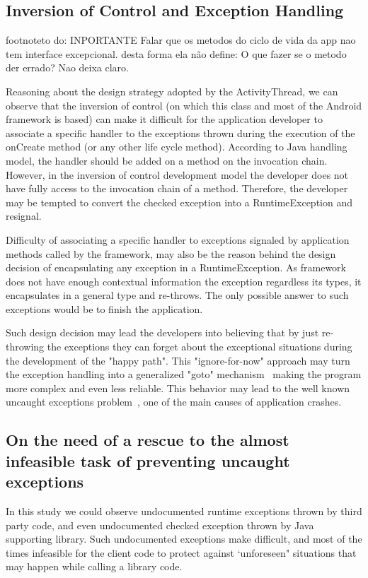 \documentclass[conference]{IEEEtran}
\begin{document}
\subsection{Inversion of Control and Exception Handling}

footnote{to do: INPORTANTE Falar que os metodos do ciclo de vida da app nao tem interface excepcional.
desta forma ela não define: O que fazer se o metodo der errado? Nao deixa claro.}

Reasoning about the design strategy adopted by the ActivityThread,
we can observe that the inversion of control (on which this class and 
most of the Android framework is based) can make it difficult for the application developer to 
associate a specific handler to the exceptions thrown during the execution of the onCreate method (or any other life cycle method).
According to Java handling model, the handler should be added on a method on the invocation chain. 
However,  in the inversion of control development model the developer does not have fully access to 
the invocation chain of a method. Therefore, the developer may be tempted to convert the checked
 exception into a RuntimeException and resignal.

Difficulty of associating a specific handler to exceptions signaled by application methods called by the framework,
may also be the reason behind the design decision of encapsulating any exception in a RuntimeException.
As framework does not have enough contextual information the exception regardless its types,
it encapsulates in a general type and re-throws. The only possible answer to such exceptions would be 
to finish the application.

Such design decision may lead the developers into believing that by just re-throwing 
the exceptions they can forget about the exceptional situations during the development of the "happy path". 
This "ignore-for-now" approach may turn the exception handling into a generalized "goto" mechanism~\cite{mandrioli1992advances}
 making the program more complex and even less reliable. This behavior may lead to the well known uncaught exceptions 
problem~\cite{jo2004uncaught}, one of the main causes of application crashes.  

\subsection{On the need of a rescue to the almost infeasible task of preventing uncaught exceptions}
In this study we could observe undocumented runtime exceptions thrown by third party code,
and even undocumented checked exception thrown by Java supporting library.
Such undocumented exceptions make difficult, and most of the times infeasible
for the client code to protect against `unforeseen" situations that may happen 
while calling a library code.
\end{document}
